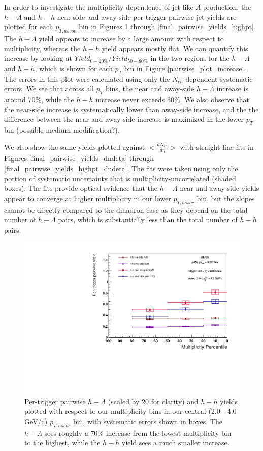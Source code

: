 \documentclass[ALICE,manyauthors]{ALICE_analysis_notes}
\begin{document}
In order to investigate the multiplicity dependence of jet-like $\Lambda$ production, the $h-\Lambda$ and $h-h$ near-side and away-side per-trigger pairwise jet yields are plotted for each $p_{T, assoc}$ bin in Figures \ref{final_pairwise_yields} through \ref{final_pairwise_yields_highpt}. The $h-\Lambda$ yield appears to increase by a large amount with respect to multiplicity, whereas the $h-h$ yield appears mostly flat. We can quantify this increase by looking at $Yield_{0-20\%} / Yield_{50-80\%}$ in the two regions for the $h-\Lambda$ and $h-h$, which is shown for each $p_{T}$ bin in Figure \ref{pairwise_plot_increase}. The errors in this plot were calculated using only the $N_{ch}$-dependent systematic errors. We see that across all $p_{T}$ bins, the near and away-side $h-\Lambda$ increase is around 70\%, while the $h-h$ increase never exceeds 30\%. We also observe that the near-side increase is systematically lower than away-side increase, and the the difference between the near and away-side increase is maximized in the lower $p_{T}$ bin (possible medium modification?).

We also show the same yields plotted against $<\frac{dN_{ch}}{d\eta}>$ with straight-line fits in Figures \ref{final_pairwise_yields_dndeta} through \ref{final_pairwise_yields_highpt_dndeta}. The fits were taken using only the portion of systematic uncertainty that is multiplicity-uncorrelated (shaded boxes). The fits provide optical evidence that the $h-\Lambda$ near and away-side yields appear to converge at higher multiplicity in our lower $p_{T, assoc}$ bin, but the slopes cannot be directly compared to the dihadron case as they depend on the total number of $h-\Lambda$ pairs, which is substantially less than the total number of $h-h$ pairs.

\clearpage 

\begin{figure}[ht]
\centering
\includegraphics[width=6in]{figures/pairwise_plot.pdf}
\caption{Per-trigger pairwise $h-\Lambda$ (scaled by 20 for clarity) and $h-h$ yields plotted with respect to our multiplicity bins in our central (2.0 - 4.0 GeV/c) $p_{T, assoc}$ bin, with systematic errors shown in boxes. The $h-\Lambda$ sees roughly a 70\% increase from the lowest multiplicity bin to the highest, while the $h-h$ yield sees a much smaller increase.}
\label{final_pairwise_yields}
\end{figure}
\end{document}

